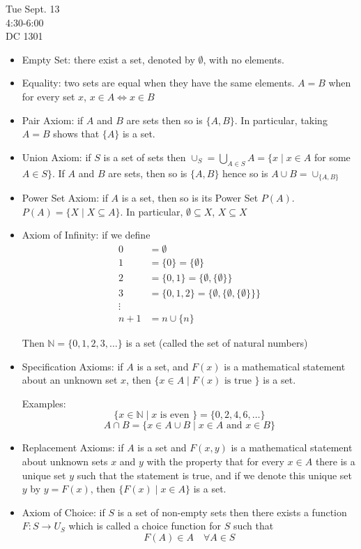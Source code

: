 
Tue Sept. 13\\
4:30-6:00\\
DC 1301


\begin{itemize}
    \item Empty Set: there exist a set, denoted by $\emptyset$, with no elements.
    \item Equality: two sets are equal when they have the same elements. $A = B$ when for every set $x$, $x\in A \iff x\in B$
    \item Pair Axiom: if $A$ and $B$ are sets then so is $\{A,B\}$. In particular, taking $A=B$ shows that $\{A\}$ is a set.
    \item Union Axiom: if $S$ is a set of sets then $\cup_{S} = \bigcup_{A\in S} A= \{x\mid x\in A$ for some $A\in S\} $. If $A$ and $B$ are sets, then so is $\{A,B\}$ hence so is $A\cup B = \cup_{\{A,B\}}$
    \item Power Set Axiom: if $A$ is a set, then so is its Power Set $P(A)$. $P(A) = \{X\mid X\subseteq A\}$. In particular, $\emptyset \subseteq X$, $X\subseteq X$
    \item Axiom of Infinity: if we define
        \begin{align*}
            0 & = \emptyset \\
            1 & = \{0\} = \{\emptyset\} \\
            2 & = \{0,1\} = \{\emptyset,\{\emptyset\}\}\\
            3 & = \{0,1,2\} = \{\emptyset, \{\emptyset,\{\emptyset\}\}\}\\
            \vdots&\\
            n+1 & = n \cup \{n\}
        \end{align*}
        
        Then $\mathbb{N}=\{0,1,2,3,\dots\}$ is a set (called the set of natural numbers)
    \item Specification Axioms: if $A$ is a set, and $F(x)$ is a mathematical statement about an unknown set $x$, then $\{x\in A \mid F(x)\text{ is true }\}$ is a set.
    
    Examples:
    $$\{x\in\mathbb{N}\mid x\text{ is even }\} = \{0,2,4,6,\dots\}$$
    $$A \cap B = \{x\in A\cup B \mid x\in A \text{ and } x\in B\}$$
    \item Replacement Axioms: if $A$ is a set and $F(x,y)$ is a mathematical statement about unknown sets $x$ and $y$ with the property that for every $x\in A$ there is a unique set $y$ such that the statement is true, and if we denote this unique set $y$ by $y=F(x)$, then $\{F(x) \mid x\in A\}$ is a set.
    
    \item Axiom of Choice: if $S$ is a set of non-empty sets then there exists a function $F\colon S\to U_S$ which is called a choice function for $S$ such that $$F(A)\in A \quad \forall A\in S$$

\end{itemize}

